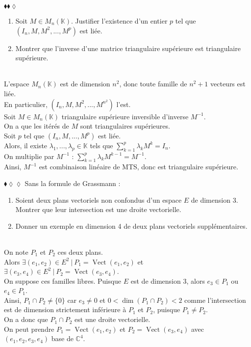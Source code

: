 \documentclass[11pt]{article}
\newcommand*{\C}{\mathbb{C}}
\newcommand*{\K}{\mathbb{K}}
\DeclareMathOperator*{\vect}{Vect}
\begin{document}
\begin{exercise}{$\blacklozenge\blacklozenge\lozenge$}{}
    \begin{enumerate}[topsep=0pt,itemsep=-0.9 ex]
        \item Soit $M \in M_n(\K)$. Justifier l'existence d'un entier $p$ tel que $(I_n, M, M^2, ..., M^p)$ est liée.
        \item Montrer que l'inverse d'une matrice triangulaire supérieure est triangulaire supérieure.
    \end{enumerate}
    \tcblower\\[0.2cm]
     L'espace $M_n(\K)$ est de dimension $n^2$, donc toute famille de $n^2+1$ vecteurs est liée.\\
    En particulier, $(I_n, M, M^2, ..., M^{n^2})$ l'est.\\[0.2cm]
     Soit $M \in M_n(\K)$ triangulaire supérieure inversible d'inverse $M^{-1}$.\\
    On a que les itérés de $M$ sont triangulaires supérieures.\\
    Soit $p$ tel que $(I_n, M, ..., M^p)$ est liée.\\
    Alors, il existe $\lambda_1, ..., \lambda_p \in \K$ tels que $\sum_{k=1}^p\lambda_k M^k = I_n$.\\
    On multiplie par $M^{-1}$ : $\sum_{k=1}^p\lambda_k M^{k-1} = M^{-1}$.\\
    Ainsi, $M^{-1}$ est combinaison linéaire de MTS, donc est triangulaire supérieure.
\end{exercise}

\begin{exercise}{$\blacklozenge\lozenge\lozenge$}{}
    Sans la formule de Grassmann :
    \begin{enumerate}[topsep=0pt,itemsep=-0.9 ex]
        \item Soient deux plans vectoriels non confondus d'un espace $E$ de dimension 3. Montrer que leur intersection est une droite vectorielle.
        \item Donner un exemple en dimension 4 de deux plans vectoriels supplémentaires.
    \end{enumerate}
    \tcblower\\[0.2cm]
     On note $P_1$ et $P_2$ ces deux plans.\\
    Alors $\exists (e_1, e_2) \in E^2 ~ | ~ P_1 = \vect(e_1, e_2)$ et $\exists (e_3, e_4) \in E^2 ~ | ~ P_2 = \vect(e_3, e_4)$.\\
    On suppose ces familles libres. Puisque $E$ est de dimension 3, alors $e_3 \in P_1$ ou $e_4 \in P_1$.\\
    Ainsi, $P_1 \cap P_2 \neq \{0\}$ car $e_3 \neq 0$ et $0<\dim(P_1 \cap P_2)<2$ comme l'intersection est de dimension strictement inférieure à $P_1$ et $P_2$, puisque $P_1 \neq P_2$.\\
    On a donc que $P_1 \cap P_2$ est une droite vectorielle.\\[0.2cm]
     On peut prendre $P_1 = \vect(e_1, e_2)$ et $P_2 = \vect(e_3, e_4)$ avec $(e_1, e_2, e_3, e_4)$ base de $\C^4$.
\end{exercise}
\end{document}
